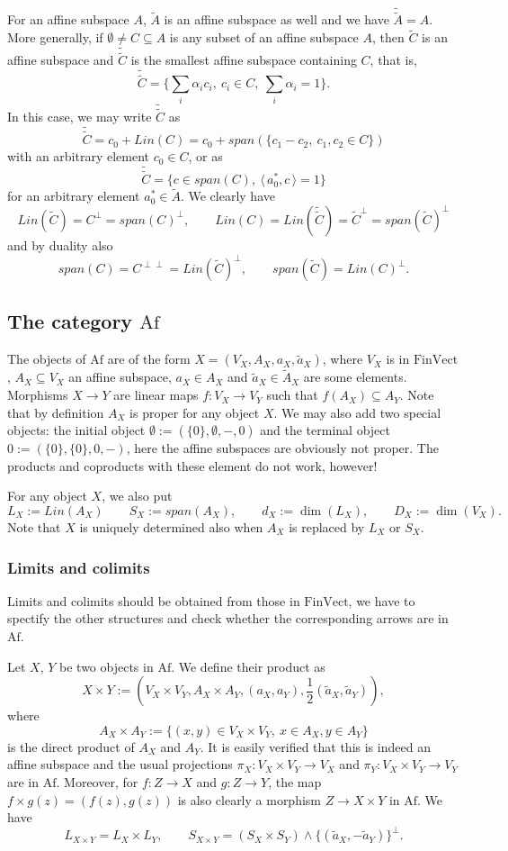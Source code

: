 \documentclass[12pt]{article}
\theoremstyle{definition}
\theoremstyle{remark}
\def\<{\langle\,}
\def\>{\,\rangle}
\def \Af{\mathrm{Af}}
\def \FV{\mathrm{FinVect}}
\def\bX{ X}
\def\bY{ Y}
\def\bZ{Z}
\begin{document}
For an affine subspace $A$, $\tilde A$ is an affine subspace as well and we have
$\tilde{\tilde A}=A$. More generally, if $\emptyset\ne C\subseteq A$ is any  subset of an affine
subspace $A$, then $\tilde C$ is an affine subspace 
and $\tilde{\tilde C}$ is the smallest
affine subspace containing $C$, that is,
\[
\tilde{\tilde C}=\{\sum_i \alpha_i c_i,\ c_i\in C,\ \sum_i\alpha_i=1\}.
\]
In this case, we may write $\tilde{\tilde C}$ as
\[
\tilde{\tilde C}=c_0+Lin(C)=c_0+span(\{c_1-c_2,\ c_1,c_2\in C\})
\]
with an arbitrary element $c_0\in C$, or as
\[
\tilde{\tilde C}=\{c\in span(C),\ \<a_0^*,c\>=1\}
\]
for an arbitrary element $a_0^*\in \tilde A$. We clearly have
\[
Lin(\tilde C)=C^\perp=span(C)^\perp,\qquad Lin(C)=Lin(\tilde{\tilde C})=\tilde
C^\perp=span(\tilde C)^\perp
\]
and by duality also
\[
span(C)=C^{\perp\perp} =Lin(\tilde C)^\perp,\qquad span(\tilde C)=Lin(C)^\perp.
\]





\subsection{The category $\Af$}


The objects of $\Af$ are of the form $X=(V_X,A_X,a_X,\tilde a_X)$, where $V_X$ is in
$\FV$, $A_X\subseteq V_X$ an affine subspace, $a_X\in A_X$ and $\tilde a_X\in \tilde A_X$
are some elements. Morphisms $X\to Y$ are linear maps $f:V_X\to V_Y$ such that
$f(A_X)\subseteq A_Y$. Note that by definition $A_X$ is proper for any object $X$. We may
also add
two special objects: the initial object $\emptyset:=(\{0\}, \emptyset, -, 0)$ and the terminal
object $0:=(\{0\},\{0\},0,-)$, here the affine subspaces are obviously not proper. The
products and coproducts with these element do not work, however!

For any object $X$, we also put 
\[
L_X:=Lin(A_X)\qquad S_X:=span(A_X),\qquad  d_X:=\dim(L_X),\qquad D_X:=\dim(V_X).
\]
Note that $X$ is
uniquely determined also when $A_X$ is replaced by $L_X$ or $S_X$. 


\subsubsection{Limits and colimits}

Limits and colimits should be obtained from those in $\FV$, we have to spectify the other
structures and check  whether the corresponding arrows are in $\Af$.  

Let $\bX$, $\bY$ be two objects in $\Af$. We define their product as
\[
\bX\times \bY:=(V_\bX\times V_\bY, A_\bX\times A_\bY, (a_X,a_Y), \frac12(\tilde a_X,\tilde
a_Y)),
\]
where 
\[
A_\bX\times A_\bY:=\{(x,y)\in V_\bX\times V_\bY,\ x\in A_\bX, y\in A_\bY\}
\]
is the direct product of $A_\bX$ and $A_\bY$. It is easily verified that this is indeed an
affine subspace and the usual projections $\pi_\bX:V_\bX\times V_\bY\to V_\bX$ and $\pi_\bY:V_\bX\times
V_\bY\to V_\bY$ are in $\Af$. Moreover, for $f:\bZ\to \bX$  and $g:\bZ\to \bY$, the map
$f\times g(z)=(f(z),g(z))$ is also clearly a morphism $\bZ\to \bX\times\bY$  in $\Af$. 
We have
\[
L_{X\times Y}=L_X\times L_Y,\qquad S_{X\times Y}= (S_X\times S_Y)\wedge \{(\tilde
a_X,-\tilde a_Y)\}^\perp.
\]
\end{document}
